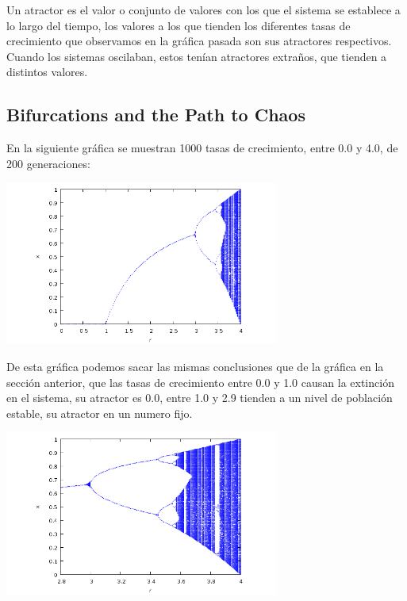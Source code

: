 \documentclass{article}
\begin{document}
Un atractor es el valor o conjunto de valores con los que el sistema se establece a lo largo del tiempo, los valores a los que tienden los diferentes tasas de crecimiento que observamos en la gráfica pasada son sus atractores respectivos. Cuando los sistemas oscilaban, estos tenían atractores extraños, que tienden a distintos valores. 

\subsection{Bifurcations and the Path to Chaos}

En la siguiente gráfica se muestran 1000 tasas de crecimiento, entre 0.0 y 4.0, de 200 generaciones: 

\begin{center}
	\includegraphics[width=9cm]{pic2.png}
    
\end{center}
\vspace{0.3cm}

De esta gráfica podemos sacar las mismas conclusiones que de la gráfica en la sección anterior, que las tasas de crecimiento entre 0.0 y 1.0 causan la extinción en el sistema, su atractor es 0.0, entre 1.0 y 2.9 tienden a un nivel de población estable, su atractor en un numero fijo. 

\begin{center}
	\includegraphics[width=9cm]{pic3.png}
    
\end{center}
\vspace{0.3cm}
\end{document}

